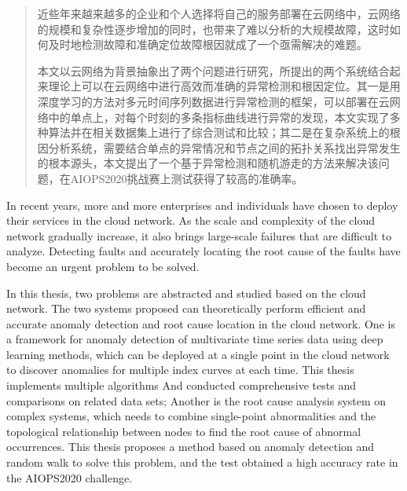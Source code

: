 

\begin{abstract}
  近些年来越来越多的企业和个人选择将自己的服务部署在云网络中，云网络的规模和复杂性逐步增加的同时，也带来了难以分析的大规模故障，这时如何及时地检测故障和准确定位故障根因就成了一个亟需解决的难题。

  本文以云网络为背景抽象出了两个问题进行研究，所提出的两个系统结合起来理论上可以在云网络中进行高效而准确的异常检测和根因定位。其一是用深度学习的方法对多元时间序列数据进行异常检测的框架，可以部署在云网络中的单点上，对每个时刻的多条指标曲线进行异常的发现，本文实现了多种算法并在相关数据集上进行了综合测试和比较；其二是在复杂系统上的根因分析系统，需要结合单点的异常情况和节点之间的拓扑关系找出异常发生的根本源头，本文提出了一个基于异常检测和随机游走的方法来解决该问题，在AIOPS2020挑战赛上测试获得了较高的准确率。

\end{abstract}

\begin{abstract*}
  In recent years, more and more enterprises and individuals have chosen to deploy their services in the cloud network. As the scale and complexity of the cloud network gradually increase, it also brings large-scale failures that are difficult to analyze. Detecting faults and accurately locating the root cause of the faults have become an urgent problem to be solved.

  In this thesis, two problems are abstracted and studied based on the cloud network. The two systems proposed can theoretically perform efficient and accurate anomaly detection and root cause location in the cloud network. One is a framework for anomaly detection of multivariate time series data using deep learning methods, which can be deployed at a single point in the cloud network to discover anomalies for multiple index curves at each time. This thesis implements multiple algorithms And conducted comprehensive tests and comparisons on related data sets; Another is the root cause analysis system on complex systems, which needs to combine single-point abnormalities and the topological relationship between nodes to find the root cause of abnormal occurrences. This thesis proposes a method based on anomaly detection and random walk to solve this problem, and the test obtained a high accuracy rate in the AIOPS2020 challenge.

\end{abstract*}
